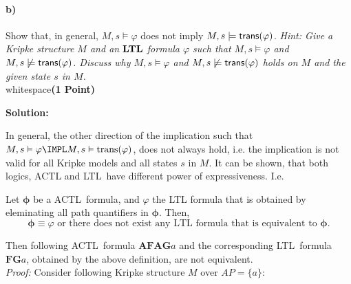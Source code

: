 \paragraph{b)} Show that, in general, $M, s \models \varphi$ does not imply $M, s \models \trans(\varphi)$.
\emph{Hint: Give a Kripke structure $M$ and an $\mathbf{LTL}$ formula $\varphi$ such that $M, s \models \varphi$ and $M, s \not\models \trans(\varphi)$. Discuss why $M, s \models \varphi$ and $M, s \not\models \trans(\varphi)$ holds on $M$ and the given state $s$ in $M$.}\\{\color{white} whitespace}\hfill\textbf{(1 Point)}

\textbf{Solution:}
\bigskip

In general, the other direction of the implication such that $M,s\vDash
\varphi \IMPL M,s\vDash \mathrm{trans}(\varphi )$, does not always hold,
i.e. the implication is not valid for all Kripke models and all states $s$
in $M$. It can be shown, that both logics, ACTL and LTL\ have different
power of expressiveness. I.e.

\begin{definition}
Let $\mathbf{\phi }$ be a ACTL\ formula, and $\varphi $ the LTL formula that
is obtained by eleminating all path quantifiers in $\mathbf{\phi }$. Then,%
\begin{equation*}
\mathbf{\phi }\equiv \varphi \text{ or there does not exist any LTL\ formula
that is equivalent to }\mathbf{\phi }\text{.}
\end{equation*}
\end{definition}

Then following ACTL\ formula $\mathbf{AFAG}a$ and the corresponding LTL\
formula $\mathbf{FG}a$, obtained by the above definition, are not equivalent.
\bigskip\\

\textit{Proof:} Consider following Kripke structure $M$ over $AP=\{a\}$:

\begin{center}
\end{center}

